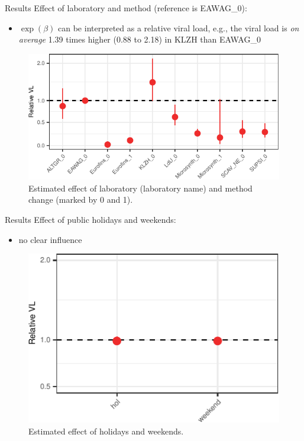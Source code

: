 \documentclass[
  ignorenonframetext,
]{beamer}
\providecommand{\tightlist}{%
  \setlength{\itemsep}{0pt}\setlength{\parskip}{0pt}}
\begin{document}
\begin{frame}{Results}
\protect\hypertarget{results-2}{}
Effect of \alert{laboratory} and method (reference is EAWAG\_0):

\begin{itemize}
\tightlist
\item
  \(\exp(\beta)\) can be interpreted as a \alert{relative viral load},
  e.g., the viral load is \emph{on average} 1.39 times higher (0.88 to
  2.18) in KLZH than EAWAG\_0
\end{itemize}

\begin{figure}
\includegraphics[width=0.7\linewidth]{2023-11-07_pres_files/figure-beamer/res1-1} \caption{Estimated effect of laboratory (laboratory name) and method change (marked by 0 and 1).}\label{fig:res1}
\end{figure}
\end{frame}

\begin{frame}{Results}
\protect\hypertarget{results-3}{}
Effect of \alert{public holidays} and \alert{weekends}:

\begin{itemize}
\tightlist
\item
  no clear influence
\end{itemize}

\begin{figure}
\includegraphics[width=0.5\linewidth]{2023-11-07_pres_files/figure-beamer/res2-1} \caption{Estimated effect of holidays and weekends.}\label{fig:res2}
\end{figure}
\end{frame}
\end{document}
